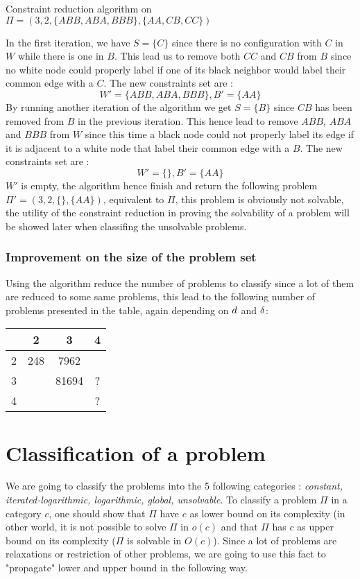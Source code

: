 \begin{exmp} Constraint reduction algorithm on $\Pi = (3, 2, \{ABB, ABA, BBB\}, \{AA, CB, CC\})$

In the first iteration, we have $S = \{C\}$ since there is no configuration with $C$ in $W$ while there is one in $B$.
This lead us to remove both $CC$ and $CB$ from $B$ since no white node could properly label if one of its black neighbor would label their common edge with a $C$.
The new constraints set are :
$$W' = \{ABB, ABA, BBB\}, B' = \{AA\}$$
By running another iteration of the algorithm we get $S = \{B\}$ since $CB$ has been removed from $B$ in the previous iteration.
This hence lead to remove $ABB$, $ABA$ and $BBB$ from $W$ since this time a black node could not properly label its edge if it is adjacent to a white node that label their common edge with a $B$.
The new constraints set are :
$$W' = \{\}, B' = \{AA\}$$
$W'$ is empty, the algorithm hence finish and return the following problem $\Pi' = (3, 2,\{\}, \{AA\})$, equivalent to $\Pi$, this problem is obviously not solvable, the utility of the constraint reduction in proving the solvability of a problem will be showed later when classifing the unsolvable problems.
\end{exmp}
\subsubsection{Improvement on the size of the problem set}

Using the algorithm reduce the number of problems to classify since a lot of them are reduced to some same problems, this lead to the following number of problems presented in the table, again depending on $\wdd$ and $\bdd$:
\begin{center}
\begin{tabular}{ | c | c | c | c |}
 \hline
 \diagbox{$\wdd$}{$\bdd$} & 2 & 3 & 4 \\ 
 \hline
 2 & 248 & 7962 & \\
 \hline
 3 &  & 81694 & ?\\
 \hline
 4 &  &  &  ?\\
\hline
\end{tabular}
\end{center}


\section{Classification of a problem}
We are going to classify the problems into the 5 following categories : \textit{constant, iterated-logarithmic, logarithmic, global, unsolvable}. To classify a problem $\Pi$ in a category $c$, one should show that $\Pi$  have $c$ as lower bound on its complexity (in other world, it is not possible to solve $\Pi$ in $o(c)$ and that $\Pi$ has $c$ as upper bound on its complexity ($\Pi$ is solvable in $O(c)$). Since a lot of problems are relaxations or restriction of other problems, we are going to use this fact to "propagate" lower and upper bound in the following way.
